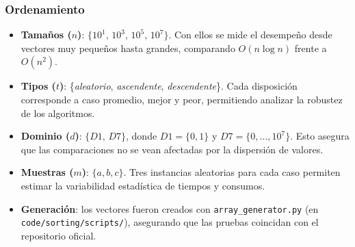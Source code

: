 \subsubsection{Ordenamiento}
\begin{itemize}
  \item \textbf{Tamaños (\(n\))}: \(\{10^1,\,10^3,\,10^5,\,10^7\}\).  
    Con ellos se mide el desempeño desde vectores muy pequeños hasta grandes, comparando \(O(n\log n)\) frente a \(O(n^2)\).
  \item \textbf{Tipos (\(t\))}: \{\emph{aleatorio}, \emph{ascendente}, \emph{descendente}\}.  
    Cada disposición corresponde a caso promedio, mejor y peor, permitiendo analizar la robustez de los algoritmos.
  \item \textbf{Dominio (\(d\))}: \(\{D1,\,D7\}\), donde  
    \(D1=\{0,1\}\) y \(D7=\{0,\dots,10^7\}\).  
    Esto asegura que las comparaciones no se vean afectadas por la dispersión de valores.
  \item \textbf{Muestras (\(m\))}: \(\{a,b,c\}\).  
    Tres instancias aleatorias para cada caso permiten estimar la variabilidad estadística de tiempos y consumos.
  \item \textbf{Generación}: los vectores fueron creados con \texttt{array\_generator.py} (en \texttt{code/sorting/scripts/}), asegurando que las pruebas coincidan con el repositorio oficial.
\end{itemize}
